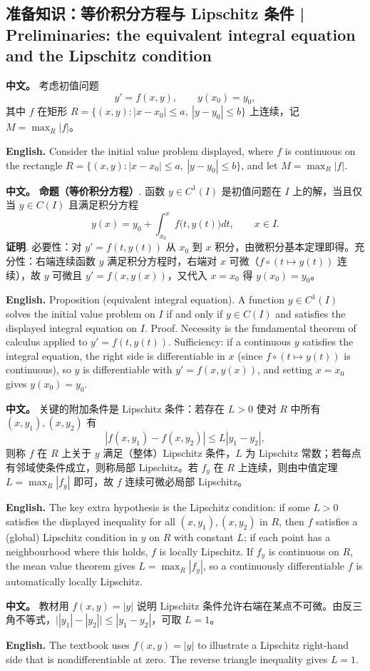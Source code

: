 \documentclass[UTF8,11pt,a4paper]{ctexart}
\newcommand{\APS}[2]{\par\noindent\textbf{中文。} #1\par\noindent\textbf{English.} #2\par}
\begin{document}
\subsection{准备知识：等价积分方程与 Lipschitz 条件 | Preliminaries: the equivalent integral equation and the Lipschitz condition}
\APS{考虑初值问题
\[
y'=f(x,y),\qquad y(x_0)=y_0,
\]
其中 $f$ 在矩形 $R=\{(x,y):|x-x_0|\le a,\ |y-y_0|\le b\}$ 上连续，记 $M=\max_R|f|$。}{Consider the initial value problem displayed, where $f$ is continuous on the rectangle $R=\{(x,y):|x-x_0|\le a,\ |y-y_0|\le b\}$, and let $M=\max_R|f|$.}
\APS{\textbf{命题（等价积分方程）}. 函数 $y\in C^1(I)$ 是初值问题在 $I$ 上的解，当且仅当 $y\in C(I)$ 且满足积分方程
\[
y(x)=y_0+\int_{x_0}^{x}f\bigl(t,y(t)\bigr)dt,\qquad x\in I .
\]
\textbf{证明}. 必要性：对 $y'=f(t,y(t))$ 从 $x_0$ 到 $x$ 积分，由微积分基本定理即得。充分性：右端连续函数 $y$ 满足积分方程时，右端对 $x$ 可微（$f\circ(t\mapsto y(t))$ 连续），故 $y$ 可微且 $y'=f(x,y(x))$，又代入 $x=x_0$ 得 $y(x_0)=y_0$。}{Proposition (equivalent integral equation). A function $y\in C^1(I)$ solves the initial value problem on $I$ if and only if $y\in C(I)$ and satisfies the displayed integral equation on $I$. Proof. Necessity is the fundamental theorem of calculus applied to $y'=f(t,y(t))$. Sufficiency: if a continuous $y$ satisfies the integral equation, the right side is differentiable in $x$ (since $f\circ(t\mapsto y(t))$ is continuous), so $y$ is differentiable with $y'=f(x,y(x))$, and setting $x=x_0$ gives $y(x_0)=y_0$.}
\APS{关键的附加条件是 Lipschitz 条件：若存在 $L>0$ 使对 $R$ 中所有 $(x,y_1),(x,y_2)$ 有
\[
|f(x,y_1)-f(x,y_2)|\le L|y_1-y_2|,
\]
则称 $f$ 在 $R$ 上关于 $y$ 满足（整体）Lipschitz 条件，$L$ 为 Lipschitz 常数；若每点有邻域使条件成立，则称局部 Lipschitz。若 $f_y$ 在 $R$ 上连续，则由中值定理 $L=\max_R|f_y|$ 即可，故 $f$ 连续可微必局部 Lipschitz。}{The key extra hypothesis is the Lipschitz condition: if some $L>0$ satisfies the displayed inequality for all $(x,y_1),(x,y_2)$ in $R$, then $f$ satisfies a (global) Lipschitz condition in $y$ on $R$ with constant $L$; if each point has a neighbourhood where this holds, $f$ is locally Lipschitz. If $f_y$ is continuous on $R$, the mean value theorem gives $L=\max_R|f_y|$, so a continuously differentiable $f$ is automatically locally Lipschitz.}
\APS{教材用 $f(x,y)=|y|$ 说明 Lipschitz 条件允许右端在某点不可微。由反三角不等式，$\bigl||y_1|-|y_2|\bigr|\le|y_1-y_2|$，可取 $L=1$。}{The textbook uses $f(x,y)=|y|$ to illustrate a Lipschitz right-hand side that is nondifferentiable at zero. The reverse triangle inequality gives $L=1$.}
\end{document}
